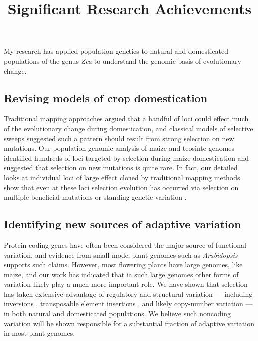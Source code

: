 \documentclass[11pt,letterpaper]{article}
\title{Significant Research Achievements}
\date{}
\begin{document}
\maketitle
\noindent

\noindent My research has applied population genetics to  natural and domesticated populations of the genus \emph{Zea} to understand the genomic basis of evolutionary change.

\subsection*{Revising models of crop domestication}
Traditional mapping approaches argued that a handful of loci could effect much of the evolutionary change during domestication, and classical models of selective sweeps suggested such a pattern should result from strong selection on new mutations. 
Our population genomic analysis of maize and teosinte genomes \citep{hufford2012comparative} identified hundreds of loci targeted by selection during maize domestication and suggested that selection on new mutations is quite rare.
In fact, our detailed looks at individual loci of large effect cloned by traditional mapping methods show that even at these loci selection evolution has occurred via selection on multiple beneficial mutations \citep{wills2013many} or standing genetic variation \citep{wills2013many, studer2011identification}.

\subsection*{Identifying new sources of adaptive variation}
Protein-coding genes have often been considered the major source of functional variation, and evidence from small model plant genomes such as \emph{Arabidopsis} \citep[e.g.][]{hancock2011adaptation} supports such claims. 
However, most flowering plants have large genomes, like maize, and our work has indicated that in such large genomes other forms of variation likely play a much more important role.  
We have shown that selection has taken extensive advantage of regulatory \citep{swanson2012reshaping,pyhajarvi2013complex} and structural variation --- including inversions \citep{pyhajarvi2013complex,fang2012megabase}, transposable element insertions \citep{studer2011identification,makarevitch2015transposable}, and likely copy-number variation \citep{chia2012maize} --- in both natural and domesticated populations. We believe such noncoding variation will be shown responsible for a substantial fraction of adaptive variation in most plant genomes.


%



\end{document}
